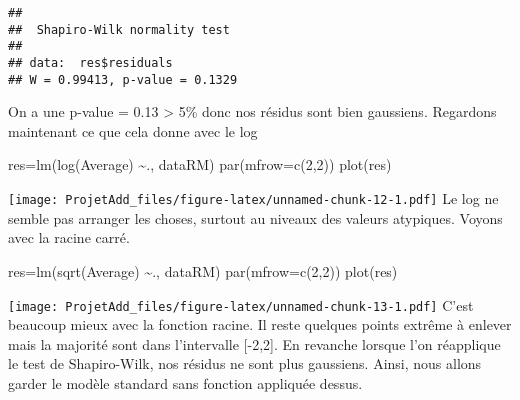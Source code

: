 \documentclass[
]{article}
\newenvironment{Shaded}{\begin{snugshade}}{\end{snugshade}}
\newcommand{\AttributeTok}[1]{\textcolor[rgb]{0.77,0.63,0.00}{#1}}
\newcommand{\DecValTok}[1]{\textcolor[rgb]{0.00,0.00,0.81}{#1}}
\newcommand{\FunctionTok}[1]{\textcolor[rgb]{0.00,0.00,0.00}{#1}}
\newcommand{\NormalTok}[1]{#1}
\newcommand{\OtherTok}[1]{\textcolor[rgb]{0.56,0.35,0.01}{#1}}
\newcommand{\SpecialCharTok}[1]{\textcolor[rgb]{0.00,0.00,0.00}{#1}}
\begin{document}
\begin{verbatim}
## 
##  Shapiro-Wilk normality test
## 
## data:  res$residuals
## W = 0.99413, p-value = 0.1329
\end{verbatim}

On a une p-value = 0.13 \textgreater{} 5\% donc nos résidus sont bien
gaussiens. Regardons maintenant ce que cela donne avec le log

\begin{Shaded}
\begin{Highlighting}[]
\NormalTok{res}\OtherTok{=}\FunctionTok{lm}\NormalTok{(}\FunctionTok{log}\NormalTok{(Average) }\SpecialCharTok{\textasciitilde{}}\NormalTok{., dataRM)}
\FunctionTok{par}\NormalTok{(}\AttributeTok{mfrow=}\FunctionTok{c}\NormalTok{(}\DecValTok{2}\NormalTok{,}\DecValTok{2}\NormalTok{))}
\FunctionTok{plot}\NormalTok{(res)}
\end{Highlighting}
\end{Shaded}

\texttt{[image: ProjetAdd\_files/figure-latex/unnamed-chunk-12-1.pdf]} Le
log ne semble pas arranger les choses, surtout au niveaux des valeurs
atypiques. Voyons avec la racine carré.

\begin{Shaded}
\begin{Highlighting}[]
\NormalTok{res}\OtherTok{=}\FunctionTok{lm}\NormalTok{(}\FunctionTok{sqrt}\NormalTok{(Average) }\SpecialCharTok{\textasciitilde{}}\NormalTok{., dataRM)}
\FunctionTok{par}\NormalTok{(}\AttributeTok{mfrow=}\FunctionTok{c}\NormalTok{(}\DecValTok{2}\NormalTok{,}\DecValTok{2}\NormalTok{))}
\FunctionTok{plot}\NormalTok{(res)}
\end{Highlighting}
\end{Shaded}

\texttt{[image: ProjetAdd\_files/figure-latex/unnamed-chunk-13-1.pdf]}
C'est beaucoup mieux avec la fonction racine. Il reste quelques points
extrême à enlever mais la majorité sont dans l'intervalle {[}-2,2{]}. En
revanche lorsque l'on réapplique le test de Shapiro-Wilk, nos résidus ne
sont plus gaussiens. Ainsi, nous allons garder le modèle standard sans
fonction appliquée dessus.

\begin{Shaded}
\end{Shaded}
\end{document}
